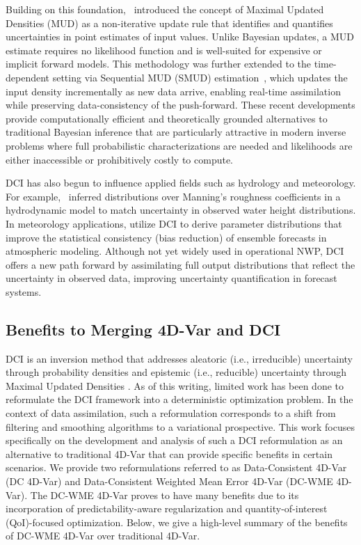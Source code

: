 \documentclass[final,1p,times]{elsarticle}
\begin{document}
Building on this foundation,~\cite{Pilosov2023} introduced the concept of Maximal Updated Densities (MUD) as a non-iterative update rule that identifies and quantifies uncertainties in point estimates of input values. 
Unlike Bayesian updates, a MUD estimate requires no likelihood function and is well-suited for expensive or implicit forward models. 
This methodology was further extended to the time-dependent setting via Sequential MUD (SMUD) estimation~\citep{del-Castillo-Negrete2024}, which updates the input density incrementally as new data arrive, enabling real-time assimilation while preserving data-consistency of the push-forward. 
These recent developments provide computationally efficient and theoretically grounded alternatives to traditional Bayesian inference that are particularly attractive in modern inverse problems where full probabilistic characterizations are needed and likelihoods are either inaccessible or prohibitively costly to compute.

DCI has also begun to influence applied fields such as hydrology and meteorology. 
For example,~\cite{Graham2015} inferred distributions over Manning’s roughness coefficients in a hydrodynamic model to match uncertainty in observed water height distributions. 
In meteorology applications, \cite{Fleury2025} utilize DCI to derive parameter distributions that improve the statistical consistency (bias reduction) of ensemble forecasts in atmospheric modeling. 
Although not yet widely used in operational NWP, DCI offers a new path forward by assimilating full output distributions that reflect the uncertainty in observed data, improving uncertainty quantification in forecast systems.


\subsection{Benefits to Merging 4D-Var and DCI}
DCI is an inversion method that addresses aleatoric (i.e., irreducible) uncertainty through probability densities \citep{Butler2018} and epistemic (i.e., reducible) uncertainty through Maximal Updated Densities \citep{Pilosov2023}. 
As of this writing, limited work has been done to reformulate the DCI framework into a deterministic optimization problem. 
In the context of data assimilation, such a reformulation corresponds to a shift from filtering and smoothing algorithms to a variational prospective.
This work focuses specifically on the development and analysis of such a DCI reformulation as an alternative to traditional 4D-Var that can provide specific benefits in certain scenarios. 
We provide two reformulations referred to as Data-Consistent 4D-Var (DC 4D-Var) and Data-Consistent Weighted Mean Error 4D-Var (DC-WME 4D-Var).
The DC-WME 4D-Var proves to have many benefits due to its incorporation of predictability-aware regularization and quantity-of-interest (QoI)-focused optimization. 
Below, we give a high-level summary of the benefits of DC-WME 4D-Var over traditional 4D-Var. 
\end{document}
